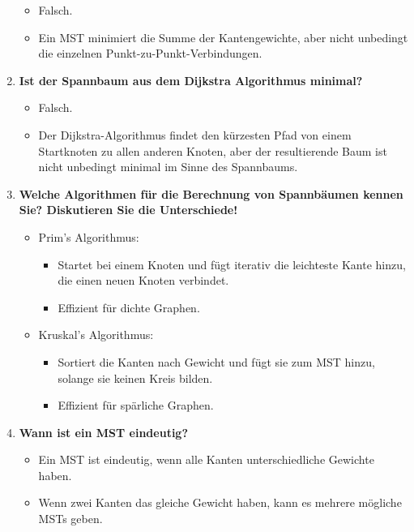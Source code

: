 \documentclass[12pt]{scrartcl}
\begin{document}
\begin{enumerate}
\begin{itemize}
              \item Falsch.
              \item Ein MST minimiert die Summe der Kantengewichte, aber nicht unbedingt die einzelnen Punkt-zu-Punkt-Verbindungen.
          \end{itemize}
    \item \textbf{Ist der Spannbaum aus dem Dijkstra Algorithmus minimal?}
          \begin{itemize}
              \item Falsch.
              \item Der Dijkstra-Algorithmus findet den kürzesten Pfad von einem Startknoten zu allen anderen Knoten, aber der resultierende Baum ist nicht unbedingt minimal im Sinne des Spannbaums.
          \end{itemize}
    \item \textbf{Welche Algorithmen für die Berechnung von Spannbäumen kennen Sie? Diskutieren Sie die Unterschiede!}
          \begin{itemize}
              \item Prim's Algorithmus:
                    \begin{itemize}
                        \item Startet bei einem Knoten und fügt iterativ die leichteste Kante hinzu, die einen neuen Knoten verbindet.
                        \item Effizient für dichte Graphen.
                    \end{itemize}
              \item Kruskal's Algorithmus:
                    \begin{itemize}
                        \item Sortiert die Kanten nach Gewicht und fügt sie zum MST hinzu, solange sie keinen Kreis bilden.
                        \item Effizient für spärliche Graphen.
                    \end{itemize}
          \end{itemize}
    \item \textbf{Wann ist ein MST eindeutig?}
          \begin{itemize}
              \item Ein MST ist eindeutig, wenn alle Kanten unterschiedliche Gewichte haben.
              \item Wenn zwei Kanten das gleiche Gewicht haben, kann es mehrere mögliche MSTs geben.
          \end{itemize}

\end{enumerate}
\end{document}
